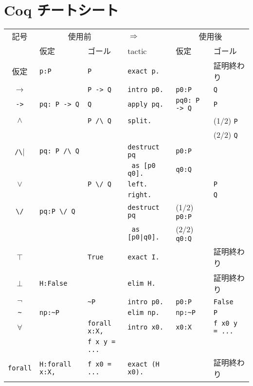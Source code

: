 \documentclass{jarticle}
\begin{document}
\section*{Coq チートシート}
  \begin{center}
  \begin{tabular}{c||l|l||l||l|l}
  記号 & \multicolumn{2}{c||}{使用前} & $\Longrightarrow$ & \multicolumn{2}{|c}{使用後} \\
   & 仮定 & ゴール & tactic &  仮定 & ゴール \\  \hline \hline
  仮定 & \verb|p:P| & \verb|P| & \verb|exact p.| & & 証明終わり \\ \hline \hline
  $\rightarrow$ & & \verb|P -> Q| & \verb|intro p0.| & \verb|p0:P| & \verb|Q| \\ \cline{2-6}
  \verb|->| & \verb|pq: P -> Q| & \verb|Q| & \verb|apply pq.| & \verb|pq0: P -> Q| & \verb|P| \\ \hline \hline
  $\wedge$ & & \verb|P /\ Q| & \verb|split.| & & (1/2) \verb|P| \\
           & &               &               & & (2/2) \verb|Q| \\ \cline{2-6}
  \verb|/\| & \verb|pq: P /\ Q| & & \verb|destruct pq| & \verb|p0:P| & \\
  & & & \verb| as [p0 q0].|& \verb|q0:Q| & \\ \hline \hline
  $\vee$ & & \verb|P \/ Q| & \verb|left.| & & \verb|P| \\ \cline{4-6}
  & & & \verb|right.| & & \verb|Q| \\ \cline{2-6}
  \verb|\/| & \verb|pq:P \/ Q| & & \verb+destruct pq+ & (1/2) \verb|p0:P| & \\
  & & & \verb+ as [p0|q0].+ & (2/2) \verb|q0:Q| & \\ \hline \hline
  $\top$ & & \verb|True| & \verb|exact I.| & & 証明終わり \\ \hline \hline
  $\bot$ & \verb|H:False| & & \verb|elim H.| & & 証明終わり \\ \hline \hline
  $\neg$ & & \verb|~P| & \verb|intro p0.| & \verb|p0:P| & \verb|False| \\ \cline{2-6}
  \verb|~| & \verb|np:~P| & & \verb|elim np.| & \verb|np:~P| & \verb|P| \\ \hline \hline
  $\forall$ & & \verb|forall x:X,| & \verb|intro x0.| & \verb|x0:X| & \verb|f x0 y = ...| \\
  & & \verb|f x y = ...| & & & \\ \cline{2-6}
  \verb|forall| & \verb|H:forall x:X,| & \verb|f x0 = ...| & \verb|exact (H x0).| & & 証明終わり \\

\end{tabular}
\end{center}
\end{document}
